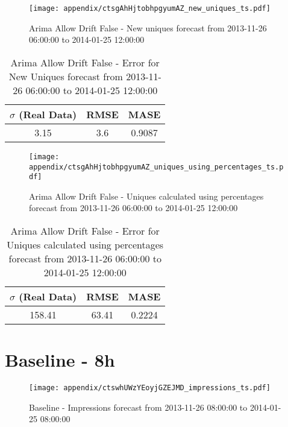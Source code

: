\begin{figure}[H] \begin{center} \leavevmode
\texttt{[image: appendix/ctsgAhHjtobhpgyumAZ\_new\_uniques\_ts.pdf]} \caption[]{
Arima Allow Drift False - New uniques forecast from 2013-11-26 06:00:00 to 2014-01-25 12:00:00} \label{fig:appendix/ctsgAhHjtobhpgyumAZ_new_uniques_ts.pdf} \end{center}
\end{figure}

\begin{table}[H]
\centering
\footnotesize
\begin{tabular}{ccc}
$\sigma$ (Real Data) & RMSE & MASE   \\ \hline
3.15 & 3.6 & 0.9087 \\
\end{tabular}

\vspace{0.5cm}

\caption[]{
Arima Allow Drift False - Error for New Uniques forecast from 2013-11-26 06:00:00 to 2014-01-25 12:00:00}
\end{table}

\begin{figure}[H] \begin{center} \leavevmode
\texttt{[image: appendix/ctsgAhHjtobhpgyumAZ\_uniques\_using\_percentages\_ts.pdf]} \caption[]{
Arima Allow Drift False - Uniques calculated using percentages forecast from 2013-11-26 06:00:00 to 2014-01-25 12:00:00} \label{fig:appendix/ctsgAhHjtobhpgyumAZ_uniques_using_percentages_ts.pdf} \end{center}
\end{figure}

\begin{table}[H]
\centering
\footnotesize
\begin{tabular}{ccc}
$\sigma$ (Real Data) & RMSE & MASE   \\ \hline
158.41 & 63.41 & 0.2224 \\
\end{tabular}

\vspace{0.5cm}

\caption[]{
Arima Allow Drift False - Error for Uniques calculated using percentages forecast from 2013-11-26 06:00:00 to 2014-01-25 12:00:00}
\end{table}

\section{Baseline - 8h}
\begin{figure}[H] \begin{center} \leavevmode
\texttt{[image: appendix/ctswhUWzYEoyjGZEJMD\_impressions\_ts.pdf]} \caption[]{
Baseline - Impressions forecast from 2013-11-26 08:00:00 to 2014-01-25 08:00:00} \label{fig:appendix/ctswhUWzYEoyjGZEJMD_impressions_ts.pdf} \end{center}
\end{figure}

